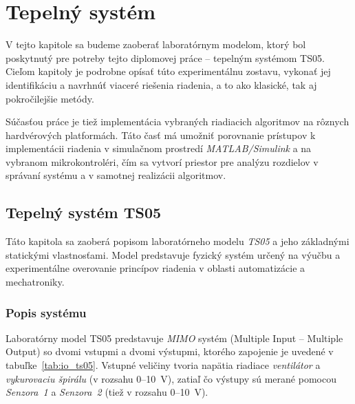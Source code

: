 
\section{Tepelný systém}

V tejto kapitole sa budeme zaoberať laboratórnym modelom, ktorý bol poskytnutý pre potreby tejto diplomovej práce – tepelným systémom TS05.  
Cieľom kapitoly je podrobne opísať túto experimentálnu zostavu, vykonať jej identifikáciu a navrhnúť viaceré riešenia riadenia, a to ako klasické, tak aj pokročilejšie metódy.

Súčasťou práce je tiež implementácia vybraných riadiacich algoritmov na rôznych hardvérových platformách.  
Táto časť má umožniť porovnanie prístupov k implementácii riadenia v simulačnom prostredí \textit{MATLAB/Simulink} a na vybranom mikrokontroléri, čím sa vytvorí priestor pre analýzu rozdielov v správaní systému a v samotnej realizácii algoritmov.


\subsection{Tepelný systém TS05}

Táto kapitola sa zaoberá popisom laboratórneho modelu \textit{TS05} a jeho základnými statickými vlastnosťami.  
Model predstavuje fyzický systém určený na výučbu a experimentálne overovanie princípov riadenia v oblasti automatizácie a mechatroniky.


\subsubsection{Popis systému}

Laboratórny model TS05 predstavuje \textit{MIMO} systém (Multiple Input – Multiple Output) so dvomi vstupmi a dvomi výstupmi, ktorého zapojenie je uvedené v tabuľke~\ref{tab:io_ts05}.  
Vstupné veličiny tvoria napätia riadiace \textit{ventilátor} a \textit{vykurovaciu špirálu} (v rozsahu 0–10~V), zatiaľ čo výstupy sú merané pomocou \textit{Senzora~1} a \textit{Senzora~2} (tiež v rozsahu 0–10~V).

